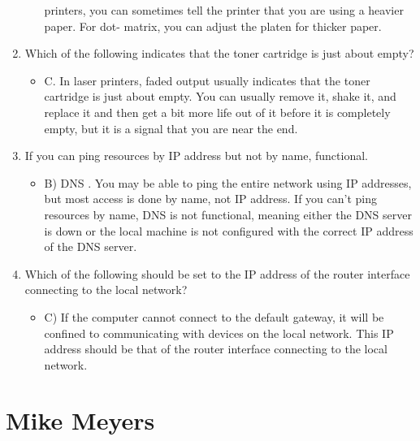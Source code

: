 \documentclass{article}
\begin{document}
\begin{enumerate}
\begin{itemize}
printers, you can sometimes tell the printer that you are using a heavier paper. For dot-
matrix, you can adjust the platen for thicker paper.
    \end{itemize}
    \item Which of the following indicates that the toner cartridge is just about empty?
    \begin{itemize}
        \item C. In laser printers, faded output usually indicates that the toner cartridge is just about
empty. You can usually remove it, shake it, and replace it and then get a bit more life out of
it before it is completely empty, but it is a signal that you are near the end.
    \end{itemize}
    \item If you can ping resources by IP address but not by name,
functional.
   \begin{itemize}
       \item B) DNS . You may be able to ping the entire network using IP addresses, but most access is done
by name, not IP address. If you can’t ping resources by name, DNS is not functional,
meaning either the DNS server is down or the local machine is not configured with the
correct IP address of the DNS server.
   \end{itemize}
   \item Which of the following should be set to the IP address of the router interface connecting to
the local network?
    \begin{itemize}
        \item C) If the computer cannot connect to the default gateway, it will be confined to
communicating with devices on the local network. This IP address should be that of the
router interface connecting to the local network.
    \end{itemize}
\end{enumerate}
\section{Mike Meyers} 
\end{document}
